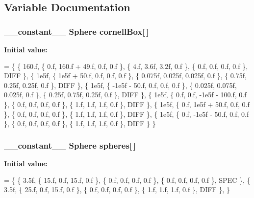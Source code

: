 \subsection{Variable Documentation}
\hypertarget{PathTracer_8cu_a56f2720c988af7d5a4f483289d1a7857}{
\subsubsection[{cornell\-Box}]{\setlength{\rightskip}{0pt plus 5cm}\-\_\-\-\_\-constant\-\_\-\-\_\- {\bf Sphere} cornell\-Box\mbox{[}$\,$\mbox{]}}}\label{PathTracer_8cu_a56f2720c988af7d5a4f483289d1a7857}
{\bfseries Initial value\-:}
\begin{DoxyCode}
=
\{
    \{ 160.f, \{ 0.f, 160.f + 49.f, 0.f, 0.f \}, \{ 4.f, 3.6f, 3.2f, 0.f \}, \{ 0.f, 0.f, 0.f, 0.f \}, DIFF \}, 
    \{ 1e5f, \{ 1e5f + 50.f, 0.f, 0.f, 0.f \}, \{ 0.075f, 0.025f, 0.025f, 0.f \}, \{ 0.75f, 0.25f, 0.25f, 0.f \}, 
      DIFF \}, 
    \{ 1e5f, \{ -1e5f - 50.f, 0.f, 0.f, 0.f \}, \{ 0.025f, 0.075f, 0.025f, 0.f \}, \{ 0.25f, 0.75f, 0.25f, 0.f \},
       DIFF \}, 
    \{ 1e5f, \{ 0.f, 0.f, -1e5f - 100.f, 0.f \}, \{ 0.f, 0.f, 0.f, 0.f \}, \{ 1.f, 1.f, 1.f, 0.f \}, DIFF \}, 
    \{ 1e5f, \{ 0.f, 1e5f + 50.f, 0.f, 0.f \}, \{ 0.f, 0.f, 0.f, 0.f \}, \{ 1.f, 1.f, 1.f, 0.f \}, DIFF \}, 
    \{ 1e5f, \{ 0.f, -1e5f - 50.f, 0.f, 0.f \}, \{ 0.f, 0.f, 0.f, 0.f \}, \{ 1.f, 1.f, 1.f, 0.f \}, DIFF \} 
\}
\end{DoxyCode}
\hypertarget{PathTracer_8cu_a605596ee17fca97fd100e0f463252f3d}{
\subsubsection[{spheres}]{\setlength{\rightskip}{0pt plus 5cm}\-\_\-\-\_\-constant\-\_\-\-\_\- {\bf Sphere} spheres\mbox{[}$\,$\mbox{]}}}\label{PathTracer_8cu_a605596ee17fca97fd100e0f463252f3d}
{\bfseries Initial value\-:}
\begin{DoxyCode}
=
\{
    \{ 3.5f, \{ 15.f, 0.f, 15.f, 0.f \}, \{ 0.f, 0.f, 0.f, 0.f \}, \{ 0.f, 0.f, 0.f, 0.f \}, SPEC \}, 
    \{ 3.5f, \{ 25.f, 0.f, 15.f, 0.f \}, \{ 0.f, 0.f, 0.f, 0.f \}, \{ 1.f, 1.f, 1.f, 0.f \}, DIFF \}, 
\}
\end{DoxyCode}

